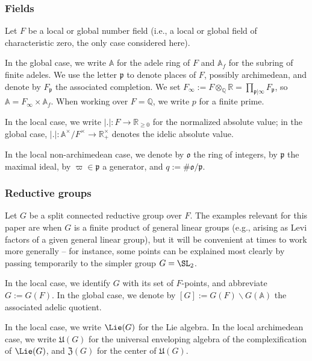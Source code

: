 \subsubsection{Fields}\label{sec:crb1dyvdtv}
Let $F$ be a local or global number field (i.e., a local or global field of characteristic zero, the only case considered here).

In the global case, we write $\mathbb{A}$ for the adele ring of $F$ and $\mathbb{A}_f$ for the subring of finite adeles.  We use the letter $\mathfrak{p}$ to denote places of $F$, possibly archimedean, and denote by $F_\mathfrak{p}$ the associated completion.  We set $F_\infty := F \otimes_{\mathbb{Q}} \mathbb{R} = \prod_{\mathfrak{p} | \infty} F_\mathfrak{p}$, so $\mathbb{A} = F_\infty \times \mathbb{A}_f$.  When working over $F = \mathbb{Q}$, we write $p$ for a finite prime.

In the local case, we write $|.| : F \rightarrow \mathbb{R}_{\geq 0}$ for the normalized absolute value; in the global case, $|.| : \mathbb{A}^\times / F^\times \rightarrow \mathbb{R}^\times_+$ denotes the idelic absolute value.

In the local non-archimedean case, we denote by $\mathfrak{o}$ the ring of integers, by $\mathfrak{p}$ the maximal ideal, by $\varpi \in \mathfrak{p}$ a generator, and $q := \# \mathfrak{o}/\mathfrak{p}$.


\subsubsection{Reductive groups}\label{sec:cumos34zyo}
Let $G$ be a split connected reductive group over $F$.  The examples relevant for this paper are when $G$ is a finite product of general linear groups (e.g., arising as Levi factors of a given general linear group), but it will be convenient at times to work more generally -- for instance, some points can be explained most clearly by passing temporarily to the simpler group $G = \SL_2$.

In the local case, we identify $G$ with its set of $F$-points, and abbreviate $G := G(F)$.  In the global case, we denote by  $[G] := G(F) \backslash G(\mathbb{A})$ the associated adelic quotient.

In the local case, we write  $\Lie(G)$ for the Lie algebra.  In the local archimedean case, we write $\mathfrak{U}(G)$ for the universal enveloping algebra  of the complexification of $\Lie(G)$, and $\mathfrak{Z}(G)$ for the center of $\mathfrak{U}(G)$.

